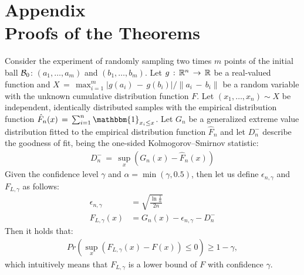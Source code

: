 

\newcommand{\beginsupplement}{%
        \setcounter{table}{0}
        \renewcommand{\thetable}{S\arabic{table}}%
        \setcounter{algorithm}{0}
        \renewcommand{\thealgorithm}{S\arabic{algorithm}}%
        \setcounter{equation}{0}
        \renewcommand{\theequation}{S\arabic{equation}}%
        \setcounter{figure}{0}
        \renewcommand{\thefigure}{S\arabic{figure}}%
        \setcounter{section}{0}
        \renewcommand{\thesection}{S\arabic{section}}%
     }

\beginsupplement

\section{Appendix\\ {\large Proofs of the Theorems}}
\begin{lemma}\label{app_lemma:F_L}
    Consider the experiment of randomly sampling two times $m$ points of the initial ball $\mathcal{B}_0$: $(a_1,\dots,a_m)$ and $(b_1,\dots,b_m)$.
    Let $g\,:\,\mathbb{R}^n\,\rightarrow\,\mathbb{R}$ be a real-valued function and $X\,{=}\,\max_{i=1}^m|g(a_i)\,{-}\,g(b_i)|/\|a_i\,{-}\,b_i\|$ be a random variable with the unknown cumulative distribution function $F$. Let $(x_1, \dots, x_n)\sim X$ be independent, identically distributed samples with the empirical distribution function $\hat{F}_n(x)\,=\,\sum_{i=1}^n\mathbbm{1}_{x_i\le x}$. Let $G_n$ be a generalized extreme value distribution fitted to the empirical distribution function $\hat{F}_n$ and let $D_n^-$ describe the goodness of fit, being the one-sided Kolmogorov–Smirnov statistic:
    \begin{align}\label{app_eq:ks-statistic}
        D_n^- \,=\,\sup_x (G_n(x) - \hat{F}_n(x))
    \end{align}
    Given the confidence level $\gamma$ and $\alpha = \min(\gamma, 0.5)$, then let us define $\epsilon_{n,\gamma}$ and $F_{L,\gamma}$ as follows:
    \begin{align}
        \epsilon_{n,\gamma} &= \sqrt{\frac{\ln{\frac1{\alpha}}}{2n}}\label{app_eq:dkw_epsilon}\\
        F_{L,\gamma}(x) &= G_n(x) - \epsilon_{n,\gamma} - D_n^-\label{app_eq:F_L bound}
    \end{align}
    Then it holds that:
    \begin{align}\label{app_eq:prob F_L bound}
        Pr(\sup_x(F_{L,\gamma}(x)-F(x))\le 0)\ge 1-\gamma,
    \end{align}
    which intuitively means that $F_{L,\gamma}$ is a lower bound of $F$ with confidence $\gamma$.
\end{lemma}
